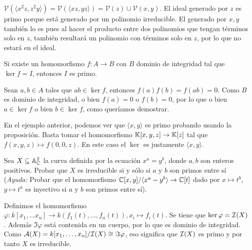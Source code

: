 \documentclass[ACGA.tex]{subfiles}
\begin{document}
\begin{ej}
$\mathcal{V}(\langle x^2z,z^2y\rangle)=\mathcal{V}(\langle xz,yz\rangle)=\mathcal{V}(z)\cup\mathcal{V}(x,y)$. El ideal generado por $z$ es primo porque está generado por un polinomio irreducible. El generado por $x,y$ también lo es pues al hacer el producto entre dos polinomios que tengan términos solo en $z$, también resultará un polinomio con términos solo en $z$, por lo que no estará en el ideal.
\end{ej}

\begin{prop}
Si existe un homomorfismo $f:A\to B$ con $B$ dominio de integridad tal que $\ker{f}=I$, entonces $I$ es primo.
\end{prop}

\begin{dem}
Sean $a,b\in A$ tales que $ab\in\ker{f}$, entonces $f(a)f(b)=f(ab)=0$. Como $B$ es dominio de integridad, o bien $f(a)=0$ o $f(b)=0$, por lo que o bien $a\in\ker{f}$ o bien $b\in\ker{f}$, como queríamos demostrar.\QED
\end{dem}

\begin{ej}\label{ej}
En el ejemplo anterior, podemos ver que $\langle x,y\rangle$ es primo probando usando la proposición.  Basta tomar el homomorfismo $\mathbb{K}[x,y,z]\to\mathbb{K}[z]$ tal que $f(x,y,z)\mapsto f(0,0,z)$. En este caso el $\ker$ es justamente $\langle x,y\rangle$.
\end{ej}

\begin{ejer}
 Sea $X\subseteq\mathbb{A}^2_{\mathbb{C}}$ la curva definida por la ecuación $x^a=y^b$, donde $a,b$ son enteros positivos. Probar que $X$ es irreducible si y sólo si $a$ y $b$ son primos entre sí (\emph{Ayuda: } Probar que el homomorfismo $\mathbb{C}[x,y]/\langle x^a-y^b\rangle\to\mathbb{C}[t]$ dado por $x\mapsto t^b$, $y\mapsto t^a$ es inyectivo si $a$ y $b$ son primos entre sí).
\end{ejer}
\begin{solucion}

Definimos el homomorfismo $\varphi:k[x_1,...x_n]\rightarrow k(f_1(t),...,f_n(t)), x_i \mapsto f_i(t)$. Se tiene que $\ker{\varphi}=\mathcal{I}(X)$. Además $\Im{\varphi}$ está contenida en un cuerpo, por lo que es dominio de integridad. Como $\mathcal{A}(X)=k[x_1,\dots,x_n]/\mathcal{I}(X) \cong \Im{\varphi}$, eso significa que $\mathcal{I}(X)$ es primo y por tanto $X$ es irreducible.

\end{solucion}
\end{document}
